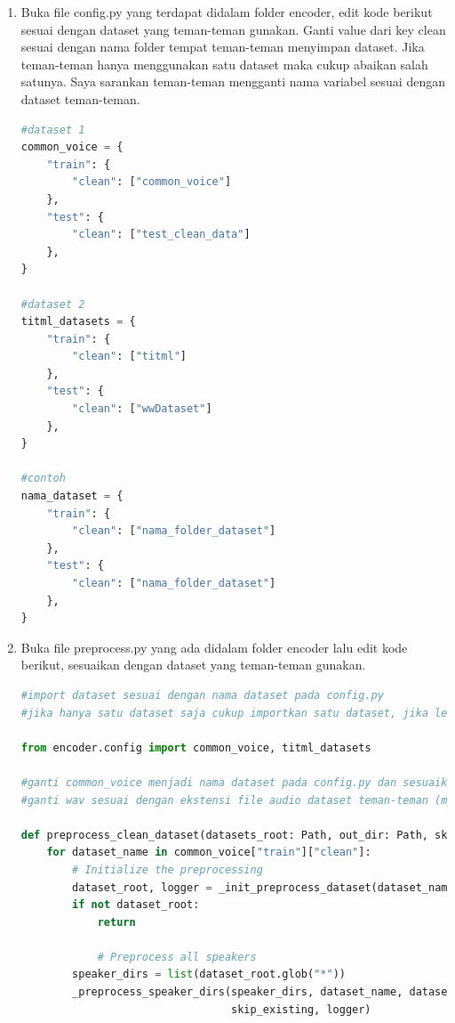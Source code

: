 \begin{enumerate}
\item Buka file config.py yang terdapat didalam folder encoder, edit kode berikut sesuai dengan dataset yang teman-teman gunakan. Ganti value dari key clean sesuai dengan nama folder tempat teman-teman menyimpan dataset. Jika teman-teman hanya menggunakan satu dataset maka cukup abaikan salah satunya. Saya sarankan teman-teman mengganti nama variabel sesuai dengan dataset teman-teman.

\begin{lstlisting}[language=Python, caption=Config Dataset]
#dataset 1
common_voice = {
    "train": {
        "clean": ["common_voice"]
    },
    "test": {
        "clean": ["test_clean_data"]
    },
}

#dataset 2
titml_datasets = {
    "train": {
        "clean": ["titml"]
    },
    "test": {
        "clean": ["wwDataset"]
    },
}

#contoh
nama_dataset = {
    "train": {
        "clean": ["nama_folder_dataset"]
    },
    "test": {
        "clean": ["nama_folder_dataset"]
    },
}
\end{lstlisting}

\item Buka file preprocess.py yang ada didalam folder encoder lalu edit kode berikut, sesuaikan dengan dataset yang teman-teman gunakan.
\begin{lstlisting}[language=Python, caption=Preprocessing Function]
#import dataset sesuai dengan nama dataset pada config.py
#jika hanya satu dataset saja cukup importkan satu dataset, jika lebih dari dua maka importkan dan pisahkan dengan koma

from encoder.config import common_voice, titml_datasets

#ganti common_voice menjadi nama dataset pada config.py dan sesuaikan dengan yang diimportkan
#ganti wav sesuai dengan ekstensi file audio dataset teman-teman (mp3, flac, wav, m4a)

def preprocess_clean_dataset(datasets_root: Path, out_dir: Path, skip_existing=False):
    for dataset_name in common_voice["train"]["clean"]:
        # Initialize the preprocessing
        dataset_root, logger = _init_preprocess_dataset(dataset_name, datasets_root, out_dir)
        if not dataset_root:
            return

            # Preprocess all speakers
        speaker_dirs = list(dataset_root.glob("*"))
        _preprocess_speaker_dirs(speaker_dirs, dataset_name, datasets_root, out_dir, "wav",
                                 skip_existing, logger)


\end{lstlisting}
\end{enumerate}
